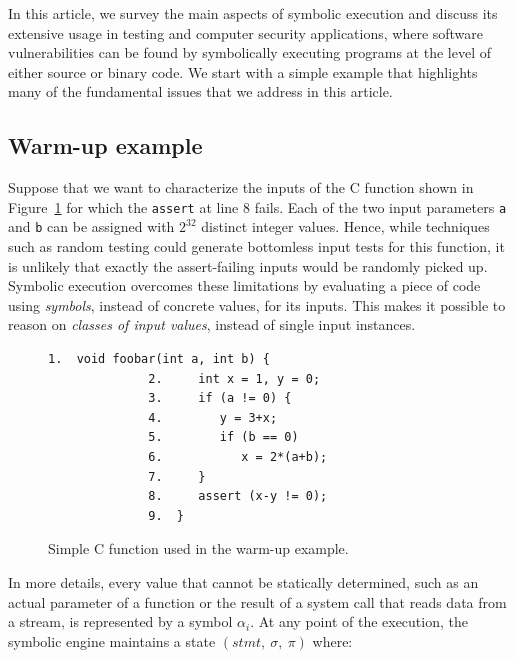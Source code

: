 In this article, we survey the main aspects of symbolic execution and discuss its extensive usage in testing and computer security applications, where software vulnerabilities can be found by symbolically executing programs at the level of either source or binary code. We start with a simple example that highlights many of the fundamental issues that we address in this article.

\subsection{Warm-up example}
\label{symbolic-execution-example}

Suppose that we want to characterize the inputs of the C function shown in Figure~\ref{fig:example-1} for which the {\tt assert} at line 8 fails. Each of the two input parameters {\tt a} and {\tt b} can be assigned with $2^{32}$ distinct integer values. Hence, while techniques such as random testing could generate bottomless input tests for this function, it is unlikely that exactly the assert-failing inputs would be randomly picked up. 
Symbolic execution overcomes these limitations by evaluating a piece of code using {\em symbols}, instead of concrete values, for its inputs. This makes it possible to reason on {\em classes of input values}, instead of single input instances. 

\begin{figure}[t]
\begin{lstlisting}[basicstyle=\ttfamily\small]
              1.  void foobar(int a, int b) {
              2.     int x = 1, y = 0;
              3.     if (a != 0) {
              4.        y = 3+x;
              5.        if (b == 0)
              6.           x = 2*(a+b);
              7.     }
              8.     assert (x-y != 0);
              9.  }
\end{lstlisting}
\caption{Simple C function used in the warm-up example.}
\label{fig:example-1}
\end{figure}

In more details, every value that cannot be statically determined, such as an actual parameter of a function or the result of a system call that reads data from a stream, is represented by a symbol $\alpha_i$.  At any point of the execution, the symbolic engine maintains a state $(stmt,~\sigma,~\pi)$ where:

